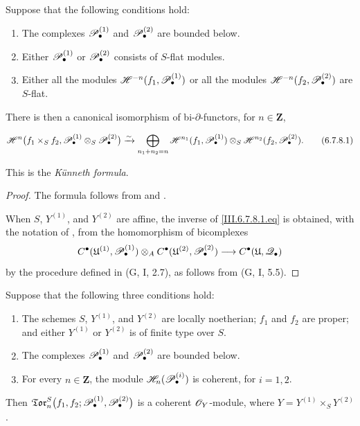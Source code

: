 \begin{theorem}[6.7.8]
\label{III.6.7.8}
Suppose that the following conditions hold:
\begin{enumerate}
  \item[{$1^\circ$}]
    The complexes $\mathscr{P}_\bullet^{(1)}$ and
    $\mathscr{P}_\bullet^{(2)}$ are bounded below.
  \item[{$2^\circ$}]
    Either $\mathscr{P}_\bullet^{(1)}$ \textup{or}
    $\mathscr{P}_\bullet^{(2)}$ consists of $S$-flat modules.


  \item[{$3^\circ$}]
    Either all the modules
    $\mathscr{H}^{-n}(f_1,\mathscr{P}_\bullet^{(1)})$ \textup{or} all the modules
    $\mathscr{H}^{-n}(f_2,\mathscr{P}_\bullet^{(2)})$ are $S$-flat.
\end{enumerate}
There is then a canonical isomorphism of bi-$\partial$-functors,
for $n\in\mathbf Z$,
\begin{env}[6.7.8.1]
\label{III.6.7.8.1}
\[
  \mathscr{H}^n
  \bigl(
    f_1\times_Sf_2,
    \mathscr{P}_\bullet^{(1)}\otimes_S\mathscr{P}_\bullet^{(2)}
  \bigr)
  \xrightarrow{\sim}
  \bigoplus_{n_1+n_2=n}
  \mathscr{H}^{n_1}(f_1,\mathscr{P}_\bullet^{(1)})
  \otimes_S
  \mathscr{H}^{n_2}(f_2,\mathscr{P}_\bullet^{(2)}).
  \tag{6.7.8.1}\label{III.6.7.8.1.eq}
\]
\end{env}
This is the \emph{K\"unneth formula}.
\end{theorem}

\begin{proof}
The formula follows from  and
.

When $S$, $Y^{(1)}$, and $Y^{(2)}$ are affine, the inverse of
\eqref{III.6.7.8.1.eq} is obtained, with the notation of
, from the homomorphism of bicomplexes
\[
  C^\bullet(\mathfrak U^{(1)},\mathscr{P}_\bullet^{(1)})
  \otimes_A
  C^\bullet(\mathfrak U^{(2)},\mathscr{P}_\bullet^{(2)})
  \longrightarrow
  C^\bullet(\mathfrak U,\mathscr{Q}_\bullet)
\]
by the procedure defined in \textnormal{(G, I, 2.7)}, as follows
from \textnormal{(G, I, 5.5)}.
\end{proof}

\begin{proposition}[6.7.9]
\label{III.6.7.9}
Suppose that the following three conditions hold:
\begin{enumerate}
  \item[{$1^\circ$}]
    The schemes $S$, $Y^{(1)}$, and $Y^{(2)}$ are locally
    noetherian; $f_1$ and $f_2$ are proper; and either
    $Y^{(1)}$ or $Y^{(2)}$ is of finite type over $S$.
  \item[{$2^\circ$}]
    The complexes $\mathscr{P}_\bullet^{(1)}$ and
    $\mathscr{P}_\bullet^{(2)}$ are bounded below.
  \item[{$3^\circ$}]
    For every $n\in\mathbf Z$, the module
    $\mathscr{H}_n(\mathscr{P}_\bullet^{(i)})$ is coherent, for $i=1,2$.
\end{enumerate}
Then $\mathfrak{Tor}_n^S
\bigl(
f_1,f_2;
\mathscr{P}_\bullet^{(1)},\mathscr{P}_\bullet^{(2)}
\bigr)$
is a coherent $\mathscr{O}_Y$-module, where
$Y=Y^{(1)}\times_SY^{(2)}$.
\end{proposition}

